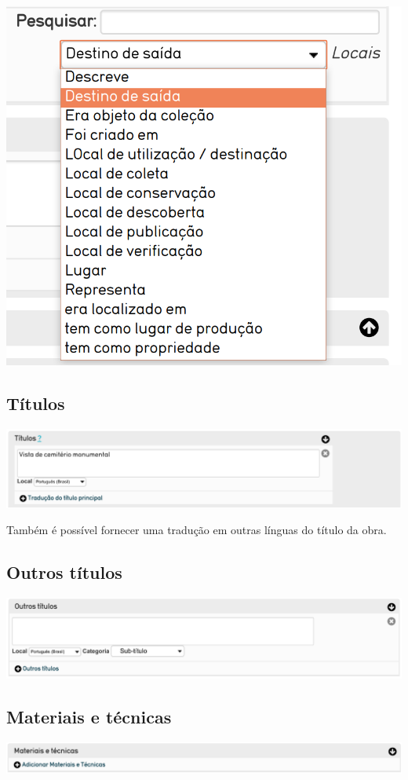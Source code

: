 \begin{flushleft}
	\includegraphics[width=0.5\linewidth]{descreveLugar}
\end{flushleft}

\subsection{Títulos}
\begin{flushleft}
	\includegraphics[width=\linewidth]{elemento-05}
\end{flushleft}
Também é possível fornecer uma tradução em outras línguas do título da obra.

\subsection{Outros títulos}
\begin{flushleft}
	\includegraphics[width=\linewidth]{elemento-06}
\end{flushleft}

\subsection{Materiais e técnicas}
\begin{flushleft}
	\includegraphics[width=\linewidth]{elemento-07}
\end{flushleft}

